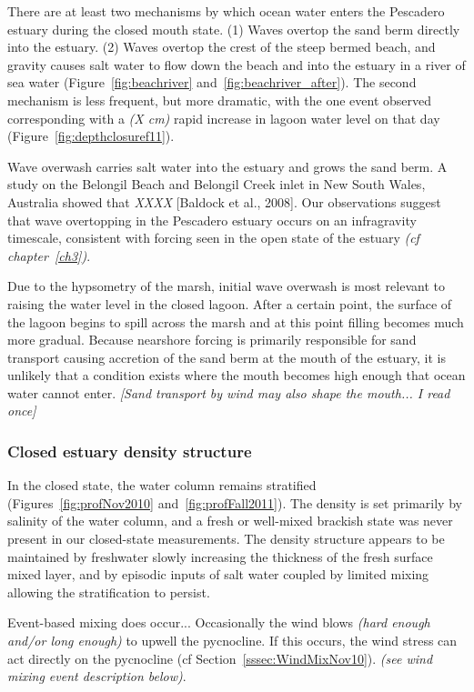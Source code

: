 {There are at least two mechanisms by which ocean water enters the Pescadero estuary during the closed mouth state. (1) Waves overtop the sand berm directly into the estuary. (2) Waves overtop the crest of the steep bermed beach, and gravity causes salt water to flow down the beach and into the estuary in a river of sea water (Figure~\ref{fig:beachriver} and~\ref{fig:beachriver_after}). The second mechanism is less frequent, but more dramatic, with the one event observed corresponding with a \emph{(X cm)} rapid increase in lagoon water level on that day (Figure~\ref{fig:depthclosuref11}).

Wave overwash carries salt water into the estuary and grows the sand berm. A study on the Belongil Beach and Belongil Creek inlet in New South Wales, Australia showed that \emph{XXXX} [Baldock et al., 2008]. Our observations suggest that wave overtopping in the Pescadero 
estuary occurs on an infragravity timescale, consistent with forcing seen in the open state of the estuary \emph{(cf chapter~\ref{ch3})}.

Due to the hypsometry of the marsh, initial wave overwash is most relevant to raising the water level in the closed lagoon. After a certain point, the surface of the lagoon begins to spill across the marsh and at this point filling becomes much more gradual. Because nearshore forcing is primarily responsible for sand transport causing accretion of the sand berm at the mouth of the estuary, it is unlikely that a condition exists where the mouth becomes high enough that ocean water cannot enter. \emph{[Sand transport by wind may also shape the mouth... I read once]}




\subsubsection{Closed estuary density structure} \label{cl_strat}


In the closed state, the water column remains stratified (Figures~\ref{fig:profNov2010} and~\ref{fig:profFall2011}). The density is set primarily by salinity of the water column, and a fresh or well-mixed brackish state was never present in our closed-state measurements. The density structure appears to be maintained by freshwater slowly increasing the thickness of the fresh surface mixed layer, and by episodic inputs of salt water coupled by limited mixing allowing the stratification to persist. 

Event-based mixing does occur...  Occasionally the wind blows \emph{(hard enough and/or long enough)} to upwell the pycnocline. If this occurs, the wind stress can act directly on the pycnocline (cf Section~\ref{sssec:WindMixNov10}). \emph{(see wind mixing event description below)}.

}
